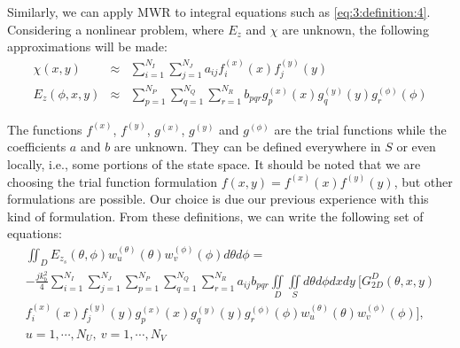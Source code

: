  		Similarly, we can apply MWR to integral equations such as \eqref{eq:3:definition:4}. Considering a nonlinear problem, where $E_z$ and $\chi$ are unknown, the following approximations will be made:
 		\begin{eqnarray}
 			\chi(x,y) &\approx& \sum\limits_{i=1}^{N_I}\sum\limits_{j=1}^{N_J} a_{ij} f^{(x)}_i(x) f^{(y)}_j(y) \label{eq:3:discretization:4} \\[5pt]
 			E_z(\phi,x,y) &\approx& \sum\limits_{p=1}^{N_P}\sum\limits_{q=1}^{N_Q}\sum\limits_{r=1}^{N_R} b_{pqr} g^{(x)}_{p}(x) g^{(y)}_{q}(y) g^{(\phi)}_r(\phi) \label{eq:3:discretization:5} 
 		\end{eqnarray}
 	
 		The functions $f^{(x)}$, $f^{(y)}$, $g^{(x)}$, $g^{(y)}$ and $g^{(\phi)}$ are the trial functions while the coefficients $a$ and $b$ are unknown. They can be defined everywhere in $S$ or even locally, i.e., some portions of the state space. It should be noted that we are choosing the trial function formulation $f(x,y) = f^{(x)}(x)f^{(y)}(y)$, but other formulations are possible. Our choice is due our previous experience with this kind of formulation. From these definitions, we can write the following set of equations:
 		\begin{multline}
 			\iint_D E_{z_s}(\theta,\phi) w^{(\theta)}_u(\theta) w^{(\phi)}_v(\phi) d\theta d\phi = \\ -\frac{jk_b^2}{4} \sum\limits_{i=1}^{N_I}\sum\limits_{j=1}^{N_J} \sum\limits_{p=1}^{N_P}\sum\limits_{q=1}^{N_Q}\sum\limits_{r=1}^{N_R} a_{ij} b_{pqr} \iint\limits_{D} \iint\limits_{S} d\theta d\phi dxdy~ \bigg[ G^D_{2D}(\theta,x,y) \\ f^{(x)}_i(x) f^{(y)}_j(y) g^{(x)}_{p}(x) g^{(y)}_{q}(y) g^{(\phi)}_r(\phi)w^{(\theta)}_u(\theta) w^{(\phi)}_v(\phi)  \bigg], \\ u = 1,\cdots, N_U,~ v = 1,\cdots,N_V \label{eq:3:discretization:6}
 		\end{multline}
 	
